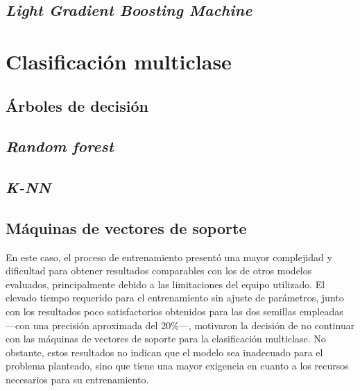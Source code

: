 \subsection{\textit{Light Gradient Boosting Machine}}
\label{subsec:lgbm_bin}



\section{Clasificación multiclase}
\label{sec:clas_multi}

\subsection{Árboles de decisión}
\label{subsec:dt_multi}



\subsection{\textit{Random forest}}
\label{subsec:rf_multi}



\subsection{\textit{K-NN}}
\label{subsec:knn_multi}



\subsection{Máquinas de vectores de soporte}
\label{subsec:svm_multi}

En este caso, el proceso de entrenamiento presentó una mayor complejidad y dificultad para obtener resultados comparables con los de otros modelos evaluados, principalmente debido a las limitaciones del equipo utilizado. El elevado tiempo requerido para el entrenamiento sin ajuste de parámetros, junto con los resultados poco satisfactorios obtenidos para las dos semillas empleadas ---con una precisión aproximada del 20\%---, motivaron la decisión de no continuar con las máquinas de vectores de soporte para la clasificación multiclase. No obstante, estos resultados no indican que el modelo sea inadecuado para el problema planteado, sino que tiene una mayor exigencia en cuanto a los recursos necesarios para su entrenamiento.

